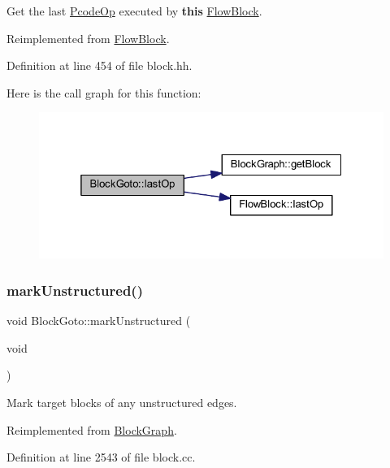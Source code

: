 Get the last \mbox{\hyperlink{class_pcode_op}{Pcode\+Op}} executed by {\bfseries{this}} \mbox{\hyperlink{class_flow_block}{Flow\+Block}}. 



Reimplemented from \mbox{\hyperlink{class_flow_block_a5db2a7d4baa2070ebf3151b13fd16d09}{Flow\+Block}}.



Definition at line 454 of file block.\+hh.

Here is the call graph for this function\+:
\nopagebreak
\begin{figure}[H]
\begin{center}
\leavevmode
\includegraphics[width=325pt]{class_block_goto_a1989016995f57acf0da08f1318a75d43_cgraph}
\end{center}
\end{figure}
\mbox{\label{class_block_goto_acc562547e24a946794c7583e61208553}} 
\subsubsection{\texorpdfstring{markUnstructured()}{markUnstructured()}}
{\footnotesize\ttfamily void Block\+Goto\+::mark\+Unstructured (\begin{DoxyParamCaption}\item[{void}]{ }\end{DoxyParamCaption})\hspace{0.3cm}{\ttfamily [virtual]}}



Mark target blocks of any unstructured edges. 



Reimplemented from \mbox{\hyperlink{class_block_graph_a6047a66449b05bf62b33a2bef8642033}{Block\+Graph}}.



Definition at line 2543 of file block.\+cc.


